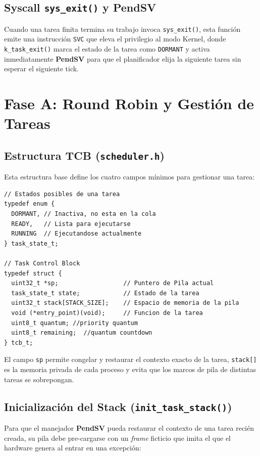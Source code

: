 \documentclass[12pt,letterpaper]{article}
\begin{document}
\subsection*{Syscall \texttt{sys\_exit()} y PendSV}
Cuando una tarea finita termina su trabajo invoca \texttt{sys\_exit()}, esta función emite una instrucción \texttt{SVC} que eleva el privilegio al modo Kernel, donde \texttt{k\_task\_exit()} marca el estado de la tarea como \texttt{DORMANT} y activa inmediatamente \textbf{PendSV} para que el planificador elija la siguiente tarea sin esperar el siguiente tick.
 
\bigskip

\section*{Fase A: Round Robin y Gestión de Tareas}
 
\subsection*{Estructura TCB (\texttt{scheduler.h})}
 
Esta estructura base define los cuatro campos mínimos para gestionar una tarea:
 
\begin{lstlisting}[style=modernc, caption={TCB base en \texttt{scheduler.h}}]
// Estados posibles de una tarea
typedef enum {
  DORMANT, // Inactiva, no esta en la cola
  READY,   // Lista para ejecutarse
  RUNNING  // Ejecutandose actualmente
} task_state_t;

// Task Control Block
typedef struct {
  uint32_t *sp;                  // Puntero de Pila actual
  task_state_t state;            // Estado de la tarea
  uint32_t stack[STACK_SIZE];    // Espacio de memoria de la pila
  void (*entry_point)(void);     // Funcion de la tarea
  uint8_t quantum; //priority quantum
  uint8_t remaining;  //quantum countdown
} tcb_t;

\end{lstlisting}
 
El campo \texttt{sp} permite congelar y restaurar el contexto exacto de la tarea, \texttt{stack[]} es la memoria privada de cada proceso y evita que los marcos de pila de distintas tareas se sobrepongan.
 
\subsection*{Inicialización del Stack (\texttt{init\_task\_stack()})}
Para que el manejador \textbf{PendSV} pueda restaurar el contexto de una tarea recién creada, su pila debe pre-cargarse con un \textit{frame} ficticio que imita el que el hardware genera al entrar en una excepción:
 
\end{document}
